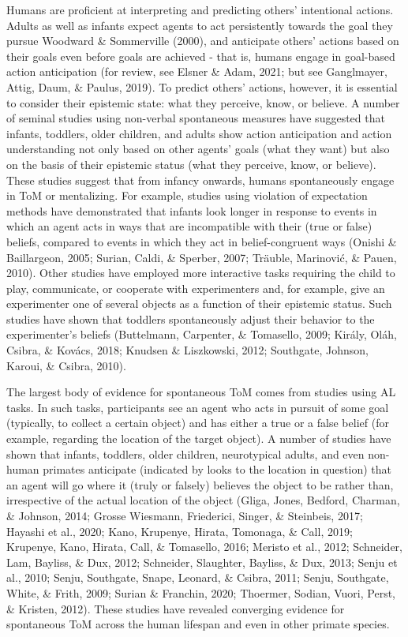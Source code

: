 \documentclass[
  english,
  man,floatsintext]{apa6}
\begin{document}
Humans are proficient at interpreting and predicting others' intentional actions. Adults as well as infants expect agents to act persistently towards the goal they pursue Woodward \& Sommerville (2000), and anticipate others' actions based on their goals even before goals are achieved - that is, humans engage in goal-based action anticipation (for review, see Elsner \& Adam, 2021; but see Ganglmayer, Attig, Daum, \& Paulus, 2019). To predict others' actions, however, it is essential to consider their epistemic state: what they perceive, know, or believe. A number of seminal studies using non-verbal spontaneous measures have suggested that infants, toddlers, older children, and adults show action anticipation and action understanding not only based on other agents' goals (what they want) but also on the basis of their epistemic status (what they perceive, know, or believe). These studies suggest that from infancy onwards, humans spontaneously engage in ToM or mentalizing. For example, studies using violation of expectation methods have demonstrated that infants look longer in response to events in which an agent acts in ways that are incompatible with their (true or false) beliefs, compared to events in which they act in belief-congruent ways (Onishi \& Baillargeon, 2005; Surian, Caldi, \& Sperber, 2007; Träuble, Marinović, \& Pauen, 2010). Other studies have employed more interactive tasks requiring the child to play, communicate, or cooperate with experimenters and, for example, give an experimenter one of several objects as a function of their epistemic status. Such studies have shown that toddlers spontaneously adjust their behavior to the experimenter's beliefs (Buttelmann, Carpenter, \& Tomasello, 2009; Király, Oláh, Csibra, \& Kovács, 2018; Knudsen \& Liszkowski, 2012; Southgate, Johnson, Karoui, \& Csibra, 2010).

The largest body of evidence for spontaneous ToM comes from studies using AL tasks. In such tasks, participants see an agent who acts in pursuit of some goal (typically, to collect a certain object) and has either a true or a false belief (for example, regarding the location of the target object). A number of studies have shown that infants, toddlers, older children, neurotypical adults, and even non-human primates anticipate (indicated by looks to the location in question) that an agent will go where it (truly or falsely) believes the object to be rather than, irrespective of the actual location of the object (Gliga, Jones, Bedford, Charman, \& Johnson, 2014; Grosse Wiesmann, Friederici, Singer, \& Steinbeis, 2017; Hayashi et al., 2020; Kano, Krupenye, Hirata, Tomonaga, \& Call, 2019; Krupenye, Kano, Hirata, Call, \& Tomasello, 2016; Meristo et al., 2012; Schneider, Lam, Bayliss, \& Dux, 2012; Schneider, Slaughter, Bayliss, \& Dux, 2013; Senju et al., 2010; Senju, Southgate, Snape, Leonard, \& Csibra, 2011; Senju, Southgate, White, \& Frith, 2009; Surian \& Franchin, 2020; Thoermer, Sodian, Vuori, Perst, \& Kristen, 2012). These studies have revealed converging evidence for spontaneous ToM across the human lifespan and even in other primate species.
\end{document}
